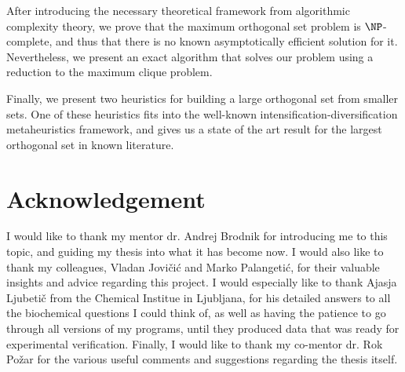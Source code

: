 \documentclass[12pt,a4paper,titlepage,openany]{report}
\begin{document}
\begin{center}
{{After introducing the necessary theoretical framework from algorithmic complexity theory, we prove that the maximum orthogonal set problem is $\NP$-complete, and thus that there is no known asymptotically efficient solution for it. Nevertheless, we present an exact algorithm that solves our problem using a reduction to the maximum clique problem.

Finally, we present two heuristics for building a large orthogonal set from smaller sets. One of these heuristics fits into the well-known intensification-diversification metaheuristics framework, and gives us a state of the art result for the largest orthogonal set in known literature.
\vspace{0.2cm}
}}
\end{center}





\newpage
\section*{Acknowledgement}

I would like to thank my mentor dr. Andrej Brodnik for introducing me to this topic, and guiding my thesis into what it has become now. I would also like to thank my colleagues, Vladan Jovičić and Marko Palangetić, for their valuable insights and advice regarding this project. I would especially like to thank Ajasja Ljubetič from the Chemical Institue in Ljubljana, for his detailed answers to all the biochemical questions I could think of, as well as having the patience to go through all versions of my programs, until they produced data that was ready for experimental verification. Finally, I would like to thank my co-mentor dr. Rok Požar for the various useful comments and suggestions regarding the thesis itself.

\newpage

\tableofcontents
{}
\newpage

\normalsize


\end{document}
